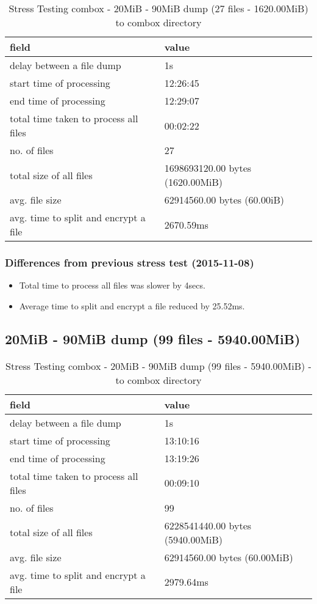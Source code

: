 \begin{center}
\begin{table}[h]
\begin{tabular}{ll}
field & value\\
\hline
delay between a file dump & 1s\\
start time of processing & 12:26:45\\
end time of processing & 12:29:07\\
total time taken to process all files & 00:02:22\\
no. of files & 27\\
total size of all files & 1698693120.00 bytes (1620.00MiB)\\
avg. file size & 62914560.00 bytes (60.00iB)\\
avg. time to split and encrypt a file & 2670.59ms\\
\end{tabular}
\caption{Stress Testing combox - 20MiB - 90MiB dump (27 files - 1620.00MiB) to combox directory}
\end{table}
\end{center}

\subsubsection{Differences from previous stress test (2015-11-08)}

\begin{itemize}
\item Total time to process all files was slower by 4secs.
\item Average time to split and encrypt a file reduced by
   25.52ms.
\end{itemize}

\subsection{20MiB - 90MiB dump (99 files - 5940.00MiB)}\label{4-st-5940}

\begin{center}
\begin{table}[h]
\begin{tabular}{ll}
field & value\\
\hline
delay between a file dump & 1s\\
start time of processing & 13:10:16\\
end time of processing & 13:19:26\\
total time taken to process all files & 00:09:10\\
no. of files & 99\\
total size of all files & 6228541440.00 bytes (5940.00MiB)\\
avg. file size & 62914560.00 bytes (60.00MiB)\\
avg. time to split and encrypt a file & 2979.64ms\\
\end{tabular}
\caption{Stress Testing combox - 20MiB - 90MiB dump (99 files - 5940.00MiB) - to combox directory}
\end{table}
\end{center}

